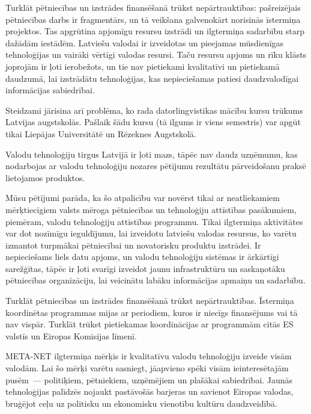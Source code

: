 \begin{multicols}{2}
Turklāt pētniecības un izstrādes finansēšanā trūkst nepārtrauktības: pašreizējais pētniecības darbs ir fragmentārs, un tā veikšana galvenokārt norisinās īstermiņa projektos.
Tas apgrūtina apjomīgu resursu izstrādi un ilgtermiņa sadarbību starp dažādām iestādēm. 
Latviešu valodai ir izveidotas un pieejamas mūsdienīgas tehnoloģijas un vairāki vērtīgi valodas resursi. 
Taču resursu apjoms un rīku klāsts joprojām ir ļoti ierobežots, un tie nav pietiekami kvalitatīvi un pietiekamā daudzumā, lai izstrādātu tehnoloģijas, kas nepieciešamas patiesi daudzvalodīgai informācijas sabiedrībai. 

Steidzami jārisina arī problēma, ko rada datorling\-vistikas mācību kursu trūkums Latvijas augstskolās.
Pašlaik šādu kursu (tā ilgums ir viens semestris) var apgūt tikai Liepājas Universitātē un Rēzeknes Augstskolā.

Valodu tehnoloģiju tirgus Latvijā ir ļoti mazs, tāpēc nav daudz uzņēmumu, kas nodarbojas ar valodu tehnoloģiju nozares pētījumu rezultātu pārveidošanu praksē lietojamos produktos. 

Mūsu pētījumi parāda, ka šo atpalicību var novērst tikai ar neatliekamiem mērķtiecīgiem valsts mēroga pētniecības un tehnoloģiju attīstības pasākumiem, piemēram, valodu tehnoloģiju attīstības programmu.
Tikai ilgtermiņa aktivitātes var dot nozīmīgu ieguldījumu, lai izveidotu latviešu valodas resursus, ko varētu izmantot turpmākai pētniecībai un novatorisku produktu izstrādei.
Ir nepieciešams liels datu apjoms, un valodu tehnoloģiju sistēmas ir ārkārtīgi sarežģītas, tāpēc ir ļoti svarīgi izveidot jaunu infrastruktūru un saskaņotāku pētniecības organizāciju, lai veicinātu labāku informācijas apmaiņu un sadarbību.

Turklāt pētniecības un izstrādes finansēšanā trūkst nepārtrauktības.
Īstermiņa koordinētas programmas mijas ar periodiem, kuros ir niecīgs finansējums vai tā nav vispār.
Turklāt trūkst pietiekamas koordinācijas ar programmām citās ES valstīs un Eiropas Komisijas līmenī.

META-NET ilgtermiņa mērķis ir kvalitatīvu valodu tehnoloģiju izveide visām valodām.
Lai šo mērķi varētu sasniegt, jāapvieno spēki visām ieinteresētajām pusēm~--- politiķiem, pētniekiem, uzņēmējiem un plašākai sabiedrībai.
Jaunās tehnoloģijas palīdzēs nojaukt pastāvošās barjeras un savienot Eiropas valodas, bruģējot ceļu uz politisku un ekonomisku vienotību kultūru daudzveidībā.

\end{multicols}

\clearpage


